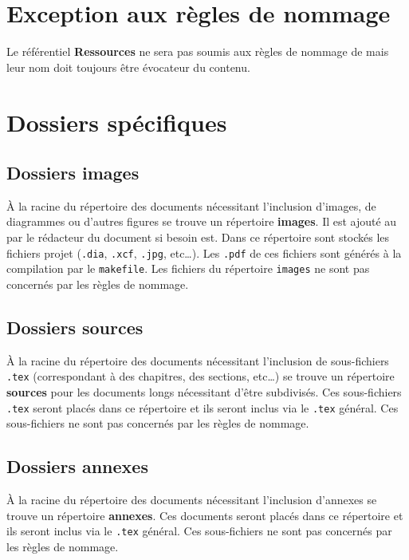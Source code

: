 \section{Exception aux règles de nommage}

Le référentiel \textbf{Ressources} ne sera pas soumis aux règles de nommage de \nomEquipe mais leur nom doit toujours être évocateur du contenu.

\section{Dossiers spécifiques}

\subsection{Dossiers images}

\`{A} la racine du répertoire des documents nécessitant l'inclusion d'images, de diagrammes ou
d'autres figures se trouve un répertoire \textbf{images}. Il est ajouté au \git{} par le
rédacteur du document si besoin est. Dans ce répertoire sont stockés les fichiers projet
(\verb+.dia+, \verb+.xcf+, \verb+.jpg+, etc\dots). Les \verb+.pdf+ de ces fichiers sont générés
à la compilation par le \verb+makefile+.
Les fichiers du répertoire \verb+images+ ne sont pas concernés par les règles de nommage.

\subsection{Dossiers sources}

\`{A} la racine du répertoire des documents nécessitant l'inclusion de sous-fichiers \verb+.tex+
(correspondant à des chapitres, des sections, etc\dots) se trouve un répertoire \textbf{sources} pour
les documents longs nécessitant d'être subdivisés. 
Ces sous-fichiers \verb+.tex+ seront placés dans ce répertoire et ils seront inclus via
le \verb+.tex+ général. Ces sous-fichiers ne sont pas concernés par les règles de nommage.

\subsection{Dossiers annexes}

\`{A} la racine du répertoire des documents nécessitant l'inclusion d'annexes se trouve un répertoire \textbf{annexes}.
Ces documents seront placés dans ce répertoire et ils seront inclus via
le \verb+.tex+ général. Ces sous-fichiers ne sont pas concernés par les règles de nommage.

